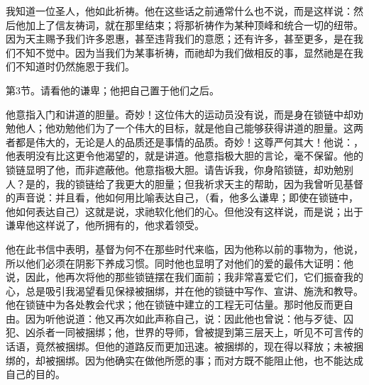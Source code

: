 我知道一位圣人，他如此祈祷。他在这些话之前通常什么也不说，而是这样说：然后他加上了信友祷词，就在那里结束；将那祈祷作为某种顶峰和统合一切的纽带。因为天主赐予我们许多恩惠，甚至违背我们的意愿；还有许多，甚至更多，是在我们不知不觉中。因为当我们为某事祈祷，而祂却为我们做相反的事，显然祂是在我们不知道时仍然施恩于我们。\par

第3节。请看他的谦卑；他把自己置于他们之后。\par

他意指入门和讲道的胆量。奇妙！这位伟大的运动员没有说，而是身在锁链中却劝勉他人；他劝勉他们为了一个伟大的目标，就是他自己能够获得讲道的胆量。这两者都是伟大的，无论是人的品质还是事情的品质。奇妙！这尊严何其大！他说：，他表明没有比这更令他渴望的，就是讲道。他意指极大胆的言论，毫不保留。他的锁链显明了他，而非遮蔽他。他意指极大胆。请告诉我，你身陷锁链，却劝勉别人？是的，我的锁链给了我更大的胆量；但我祈求天主的帮助，因为我曾听见基督的声音说：并且看，他如何用比喻表达自己，（看，他多么谦卑；即使在锁链中，他如何表达自己）这就是说，求祂软化他们的心。但他没有这样说，而是说；出于谦卑他这样说了，他所拥有的，他求着领受。\par

他在此书信中表明，基督为何不在那些时代来临，因为他称以前的事物为，他说，所以他们必须在阴影下养成习惯。同时他也显明了对他们的爱的最伟大证明：他说，因此，他再次将他的那些锁链摆在我们面前；我非常喜爱它们，它们振奋我的心，总是吸引我渴望看见保禄被捆绑，并在他的锁链中写作、宣讲、施洗和教导。他在锁链中为各处教会代求；他在锁链中建立的工程无可估量。那时他反而更自由。因为听他说道：他又再次如此声称自己，说：因此他也曾说：他与歹徒、囚犯、凶杀者一同被捆绑；他，世界的导师，曾被提到第三层天上，听见不可言传的话语，竟然被捆绑。但他的道路反而更加迅速。被捆绑的，现在得以释放；未被捆绑的，却被捆绑。因为他确实在做他所愿的事；而对方既不能阻止他，也不能达成自己的目的。\par

